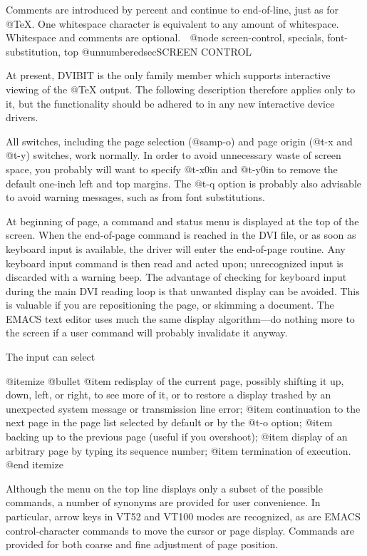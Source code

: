 {Comments are introduced by percent and continue to end-of-line,
just as for @TeX{}.  One whitespace character is equivalent to
any amount of whitespace.  Whitespace and comments are optional.

@node screen-control, specials, font-substitution, top
@unnumberedsec{SCREEN CONTROL}

At present, DVIBIT is the only family member which supports
interactive viewing of the @TeX{} output.  The following
description therefore applies only to it, but the functionality
should be adhered to in any new interactive device drivers.

All switches, including the page selection (@samp{-o}) and page
origin (@t{-x} and @t{-y}) switches, work normally.  In order to
avoid unnecessary waste of screen space, you probably will want
to specify @t{-x0in} and @t{-y0in} to remove the default one-inch
left and top margins.  The @t{-q} option is probably also
advisable to avoid warning messages, such as from font
substitutions.

At beginning of page, a command and status menu is displayed at
the top of the screen.  When the end-of-page command is reached
in the DVI file, or as soon as keyboard input is available, the
driver will enter the end-of-page routine.  Any keyboard input
command is then read and acted upon; unrecognized input is
discarded with a warning beep.  The advantage of checking for
keyboard input during the main DVI reading loop is that unwanted
display can be avoided.  This is valuable if you are
repositioning the page, or skimming a document.  The EMACS text
editor uses much the same display algorithm---do nothing more to
the screen if a user command will probably invalidate it anyway.

The input can select

@itemize @bullet
@item
redisplay of the current page, possibly shifting it up,
down, left, or right, to see more of it, or to restore a
display trashed by an unexpected system message or
transmission line error;
@item
continuation to the next page in the page list selected
by default or by the @t{-o} option;
@item
backing up to the previous page (useful if you overshoot);
@item
display of an arbitrary page by typing its sequence number;
@item
termination of execution.
@end itemize

Although the menu on the top line displays only a subset of the
possible commands, a number of synonyms are provided for user
convenience.  In particular, arrow keys in VT52 and VT100 modes
are recognized, as are EMACS control-character commands to move
the cursor or page display.  Commands are provided for both
coarse and fine adjustment of page position.

}
